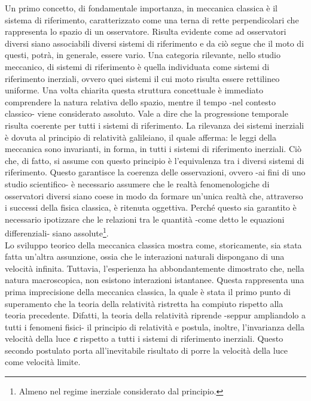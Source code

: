 Un primo concetto, di fondamentale importanza, in meccanica classica è il sistema di riferimento, caratterizzato come una terna di rette perpendicolari che rappresenta lo spazio di un osservatore. Risulta evidente come ad osservatori diversi siano associabili diversi sistemi di riferimento e da ciò segue che il moto di questi, potrà, in generale, essere vario. Una categoria rilevante, nello studio meccanico, di sistemi di riferimento è quella individuata come sistemi di riferimento inerziali, ovvero quei sistemi il cui moto risulta essere rettilineo uniforme.
Una volta chiarita questa struttura concettuale è immediato comprendere la natura relativa dello spazio, mentre il tempo -nel contesto classico- viene considerato assoluto. Vale a dire che la progressione temporale risulta coerente per tutti i sistemi di riferimento. La rilevanza dei sistemi inerziali è dovuta al principio di relatività galileiano, il quale afferma: le leggi della meccanica sono invarianti, in forma, in tutti i sistemi di riferimento inerziali. Ciò che, di fatto, si assume con questo principio è l'equivalenza tra i diversi sistemi di riferimento. Questo garantisce la coerenza delle osservazioni, ovvero -ai fini di uno studio scientifico- è necessario assumere che le realtà fenomenologiche di osservatori diversi siano coese in modo da formare un'unica realtà che, attraverso i successi della fisica classica, è ritenuta oggettiva. Perché questo sia garantito è necessario ipotizzare che le relazioni tra le quantità -come detto le equazioni differenziali- siano assolute\footnote{Almeno nel regime inerziale considerato dal principio.}.\\
Lo sviluppo teorico della meccanica classica mostra come, storicamente, sia stata fatta un'altra assunzione, ossia che le interazioni naturali dispongano di una velocità infinita. Tuttavia, l'esperienza ha abbondantemente dimostrato che, nella natura macroscopica, non esistono interazioni istantanee. Questa rappresenta una prima imprecisione della meccanica classica, la quale è stata il primo punto di superamento che la teoria della relatività ristretta ha compiuto rispetto alla teoria precedente. 
Difatti, la teoria della relatività riprende -seppur ampliandolo a tutti i fenomeni fisici- il principio di relatività e postula, inoltre, l'invarianza della velocità della luce \textit{\textbf{c}} rispetto a tutti i sistemi di riferimento inerziali. Questo secondo postulato porta all'inevitabile risultato di porre la velocità della luce come velocità limite.
